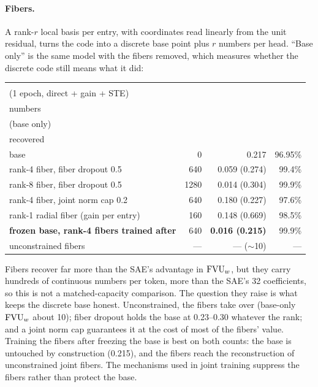 \paragraph{Fibers.} A rank-$r$ local basis per entry, with coordinates read
linearly from the unit residual, turns the code into a discrete base point
plus $r$ numbers per head. ``Base only'' is the same model with the fibers
removed, which measures whether the discrete code still means what it
did:

\begin{center}\small
\begin{tabular}{@{}lrrr@{}}
\toprule
\stackhead{variant\\(1 epoch, direct + gain + STE)} & \stackhead[r]{extra\\numbers}
& \stackhead[r]{$\fvu$\\(base only)} & \stackhead[r]{loss\\recovered} \\
\midrule
base & 0 & 0.217 & 96.95\% \\
rank-4 fiber, fiber dropout 0.5 & 640 & 0.059 (0.274) & 99.4\% \\
rank-8 fiber, fiber dropout 0.5 & 1280 & 0.014 (0.304) & 99.9\% \\
rank-4 fiber, joint norm cap 0.2 & 640 & 0.180 (0.227) & 97.6\% \\
rank-1 radial fiber (gain per entry) & 160 & 0.148 (0.669) & 98.5\% \\
\textbf{frozen base, rank-4 fibers trained after} & 640 & \textbf{0.016 (0.215)} & 99.9\% \\
unconstrained fibers & --- & --- ($\sim$10) & --- \\
\bottomrule
\end{tabular}
\end{center}

Fibers recover far more than the SAE's advantage in $\fvu$, but they carry
hundreds of continuous numbers per token, more than the SAE's 32
coefficients, so this is not a matched-capacity comparison. The question
they raise is what keeps the discrete base honest. Unconstrained, the
fibers take over (base-only $\fvu$ about 10); fiber dropout holds the base
at 0.23--0.30 whatever the rank; and a joint norm cap guarantees it at the
cost of most of the fibers' value. Training the fibers after freezing the
base is best on both counts: the base is untouched by construction
(0.215), and the fibers reach the reconstruction of unconstrained joint
fibers. The mechanisms used in joint training suppress the fibers rather
than protect the base.

